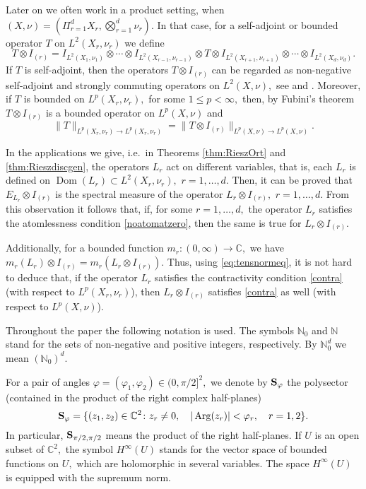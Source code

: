 \documentclass[leqno,12pt]{amsart}
\theoremstyle{definition}
\theoremstyle{remark}
\begin{document}
Later on we often work in a product setting, when $(X,\nu)=(\Pi_{r=1}^dX_r,\bigotimes_{r=1}^d\nu_r).$ In that case, for a self-adjoint or bounded operator $T$ on $L^2(X_r,\nu_r)$ we define
\begin{equation}
\label{eq:tensnot}
T\otimes I_{(r)}=I_{L^2(X_1,\nu_1)}\otimes \cdots \otimes I_{L^2(X_{r-1},\nu_{r-1})}\otimes T\otimes I_{L^2(X_{r+1},\nu_{r+1})} \otimes \cdots \otimes I_{L^2(X_d,\nu_d)}.
\end{equation} If $T$ is self-adjoint, then the operators $T\otimes I_{(r)}$ can be regarded as non-negative self-adjoint and strongly commuting operators on $L^2(X,\nu),$ see \cite[Theorem 7.23]{schmu:dgen} and \cite[Proposition A.2.2]{PhD}. Moreover, if $T$ is bounded on $L^p(X_r,\nu_r),$ for some $1\leq p<\infty,$ then, by Fubini's theorem $T\otimes I_{(r)}$ is a bounded operator on $L^p(X,\nu)$ and
        \begin{equation}
        \label{eq:tensnormeq}
        \|T\|_{L^p(X_r,\nu_r)\to L^p(X_r,\nu_r)}=\|T\otimes I_{(r)}\|_{L^p(X,\nu)\to L^p(X,\nu)}.
        \end{equation}

In the applications we give, i.e.\ in Theorems \ref{thm:RieszOrt} and \ref{thm:Rieszdiscgen}, the operators $L_r$ act on different variables, that is, each $L_r$ is defined on $\operatorname{Dom}(L_r)\subset L^2(X_r,\nu_r),$ $r=1,\ldots,d.$ Then, it can be proved that $E_{L_r}\otimes I_{(r)}$ is the spectral measure of the operator $L_r\otimes I_{(r)},$ $r=1,\ldots,d.$ From this observation it follows that, if, for some $r=1,\ldots,d,$ the operator $L_r$ satisfies the atomlessness condition \eqref{noatomatzero}, then the same is true for $L_r\otimes I_{(r)}.$

Additionally, for a bounded function $m_r:(0,\infty)\to \mathbb{C},$ we have $m_r(L_r)\otimes I_{(r)}=m_r(L_r\otimes I_{(r)}).$ Thus, using \eqref{eq:tensnormeq}, it is not hard to deduce that, if the operator $L_r$ satisfies the contractivity condition \eqref{contra} (with respect to $L^p(X_r,\nu_r)$), then $L_r\otimes I_{(r)}$ satisfies \eqref{contra} as well (with respect to $L^p(X,\nu)$).

Throughout the paper the following notation is used. The symbols $\mathbb{N}_0$ and $\mathbb{N}$ stand for the sets of non-negative and positive integers, respectively. By $\mathbb{N}_0^d$ we mean $(\mathbb{N}_0)^d.$

For a pair of angles $\varphi=(\varphi_1,\varphi_2)\in (0,\pi/2]^2,$ we denote by ${\bf S}_{\varphi}$ the polysector (contained in the product of the right complex half-planes) $${\bf S}_{\varphi}=\{(z_1,z_2)\in \mathbb{C}^2\colon z_r\neq0,\quad |\operatorname{Arg}(z_r)|<\varphi_r,\quad r=1,2\}.$$ In particular, ${\bf S}_{\pi/2,\pi/2}$ means the product of the right half-planes. If $U$ is an open subset of $\mathbb{C}^2,$ the symbol $H^{\infty}(U)$ stands for the vector space of bounded functions on $U,$ which are holomorphic in several variables. The space $H^{\infty}(U)$ is equipped with the supremum norm.
\end{document}
